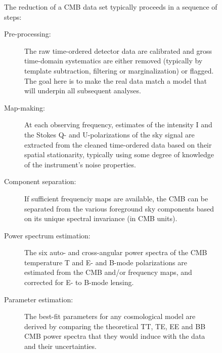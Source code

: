 \begin{figure}[htbp]
\begin{minipage}[h]{0.7\linewidth}
The reduction of a CMB data set typically proceeds in a sequence of steps:
\begin{description}
\item[ Pre-processing:] The raw time-ordered detector data are calibrated and gross time-domain systematics are either removed (typically by template subtraction, filtering or marginalization) or flagged. The goal here is to make the real data match a model that will underpin all subsequent analyses.
\item[Map-making:] At each observing frequency, estimates of the intensity I and the Stokes Q- and U-polarizations of the sky signal are extracted from the cleaned time-ordered data based on their spatial stationarity, typically using some degree of knowledge of the instrument's noise properties.
\item[Component separation:] If sufficient frequenciy maps are available, the CMB can be separated from the various foreground sky components based on its unique spectral invariance (in CMB units).
\item[Power spectrum estimation:] The six auto- and cross-angular power spectra of the CMB temperature T and E- and B-mode polarizations are estimated from the CMB and/or frequency maps, and corrected for E- to B-mode lensing.
\item[Parameter estimation:] The best-fit parameters for any cosmological model are derived by comparing the theoretical TT, TE, EE and BB CMB power spectra that they would induce with the data and their uncertainties.
\end{description}
\end{minipage}
\begin{minipage}[h]{0.275\linewidth}
\centering

\end{minipage}
\end{figure}
